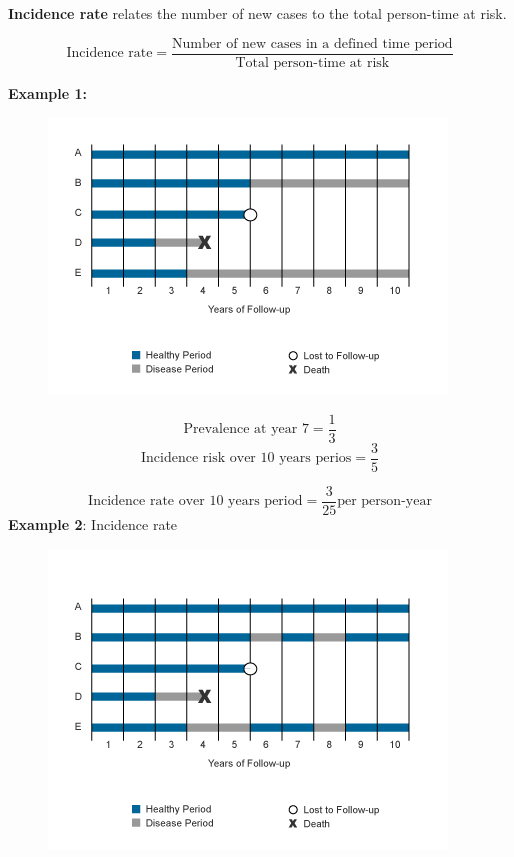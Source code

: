 \documentclass[
  letterpaper,
  DIV=11,
  numbers=noendperiod]{scrreprt}
\begin{document}
\textbf{Incidence rate} relates the number of new cases to the total
person-time at risk.

\[\text{Incidence rate} = \frac{\text{Number of new cases in a defined time period}}{\text{Total person-time at risk}}\]

\textbf{Example 1:}

\begin{figure}

{\centering \includegraphics{./images/incidence_risk.png}

}

\end{figure}

\[\text{Prevalence at year 7} = \frac{1}{3}\]
\[\text{Incidence risk over 10 years perios} = \frac{3}{5}\]

\[\text{Incidence rate over 10 years period} = \frac{3}{25}\text{per person-year}\]
\textbf{Example 2}: Incidence rate

\begin{figure}

{\centering \includegraphics{./images/incidence_rate.png}

}

\end{figure}
\end{document}
